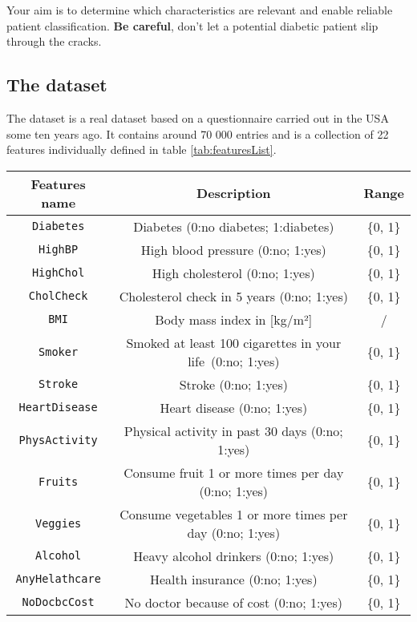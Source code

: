 \documentclass [a4paper, 11pt] {article}
\begin{document}
Your aim is to determine which characteristics are relevant and enable reliable patient classification. \textbf{Be careful}, don’t let a potential diabetic patient slip through the cracks.

\subsection{The dataset}
The dataset is a real dataset based on a questionnaire carried out in the USA some ten years ago. It contains around 70 000 entries and is a collection of 22 features individually defined in table \ref{tab:featuresList}.  

\begin{table}[htpb]
    \centering
    \hspace*{-0.5cm}
    \begin{tabular}{|c|c|c|}
    \hline
    \textbf{Features name} &\textbf{ Description }& \textbf{Range} \\\hline
    \texttt{Diabetes} & Diabetes (0:no diabetes; 1:diabetes) & \{0, 1\} \\ 
\hline
\texttt{HighBP} & High blood pressure (0:no; 1:yes) & \{0, 1\} \\ 
\hline
\texttt{HighChol} & High cholesterol (0:no; 1:yes) & \{0, 1\} \\ 
\hline
\texttt{CholCheck} & Cholesterol check in 5 years (0:no; 1:yes) & \{0, 1\} \\ 
\hline
\texttt{BMI} & Body mass index in [kg/m²] & / \\ 
\hline
\texttt{Smoker} & Smoked at least 100 cigarettes in your life~(0:no; 1:yes) & \{0, 1\} \\ 
\hline
\texttt{Stroke} & Stroke (0:no; 1:yes) & \{0, 1\} \\ 
\hline
\texttt{HeartDisease} & Heart disease (0:no; 1:yes) & \{0, 1\} \\ 
\hline
\texttt{PhysActivity} & Physical activity in past 30 days (0:no; 1:yes) & \{0, 1\} \\ 
\hline
\texttt{Fruits} & Consume fruit 1 or more times per day (0:no; 1:yes) & \{0, 1\} \\ 
\hline
\texttt{Veggies} & Consume vegetables 1 or more times per day (0:no; 1:yes) & \{0, 1\} \\ 
\hline
\texttt{Alcohol} & Heavy alcohol drinkers (0:no; 1:yes) & \{0, 1\} \\ 
\hline
\texttt{AnyHelathcare} & Health insurance (0:no; 1:yes) & \{0, 1\} \\ 
\hline
\texttt{NoDocbcCost} & No doctor because of cost (0:no; 1:yes) & \{0, 1\} \\ 

\end{tabular}
\end{table}
\end{document}
